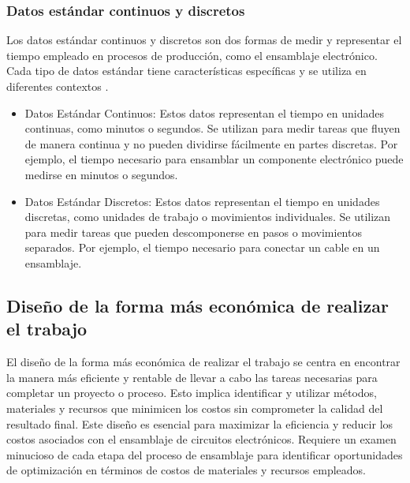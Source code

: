     \subsubsection{Datos estándar continuos y discretos}
    Los datos estándar continuos y discretos son dos formas de medir y representar el tiempo empleado en procesos de producción, como el ensamblaje electrónico. Cada tipo de datos estándar tiene características específicas y se utiliza en diferentes contextos .
    \begin{itemize}
    \item Datos Estándar Continuos: Estos datos representan el tiempo en unidades continuas, como minutos o segundos. Se utilizan para medir tareas que fluyen de manera continua y no pueden dividirse fácilmente en partes discretas. Por ejemplo, el tiempo necesario para ensamblar un componente electrónico puede medirse en minutos o segundos.
    
    \item Datos Estándar Discretos: Estos datos representan el tiempo en unidades discretas, como unidades de trabajo o movimientos individuales. Se utilizan para medir tareas que pueden descomponerse en pasos o movimientos separados. Por ejemplo, el tiempo necesario para conectar un cable en un ensamblaje.
    \end{itemize}
    
    \subsection{Diseño de la forma más económica de realizar el trabajo}
    
    El diseño de la forma más económica de realizar el trabajo se centra en encontrar la manera más eficiente y rentable de llevar a cabo las tareas necesarias para completar un proyecto o proceso. Esto implica identificar y utilizar métodos, materiales y recursos que minimicen los costos sin comprometer la calidad del resultado final. Este diseño es esencial para maximizar la eficiencia y reducir los costos asociados con el ensamblaje de circuitos electrónicos. Requiere un examen minucioso de cada etapa del proceso de ensamblaje para identificar oportunidades de optimización en términos de costos de materiales y recursos empleados.
